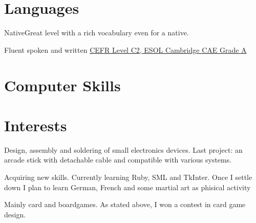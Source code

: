 \documentclass[11pt,a4paper,sans]{moderncv}
\begin{document}



\section{Languages}
{Native}{Great level with a rich vocabulary even for a native.}

{Fluent spoken and written}
{\href{https://dl.dropbox.com/u/87894135/StatementOfResult.pdf}{CEFR Level C2, ESOL Cambridge CAE Grade A}}

\section{Computer Skills}


\section{Interests}
	{Design, assembly and soldering of small electronics devices. Last project: an arcade stick with detachable cable and compatible with various systems.}

	{Acquiring new skills. Currently learning Ruby, SML and TkInter.
	Once I settle down I plan to learn German, French and some martial art as phisical activity}

	{Mainly card and boardgames. As stated above, I won a contest in card game design.}
\end{document}
